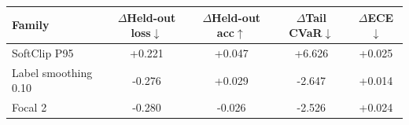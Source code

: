 \begin{tabular}{lcccc}
  \toprule
  Family & $\Delta$Held-out loss$\downarrow$ & $\Delta$Held-out acc$\uparrow$ & $\Delta$Tail CVaR$\downarrow$ & $\Delta$ECE$\downarrow$ \\
  \midrule
  SoftClip P95 & +0.221 & +0.047 & +6.626 & +0.025 \\
  Label smoothing 0.10 & -0.276 & +0.029 & -2.647 & +0.014 \\
  Focal 2 & -0.280 & -0.026 & -2.526 & +0.024 \\
  \bottomrule
\end{tabular}
